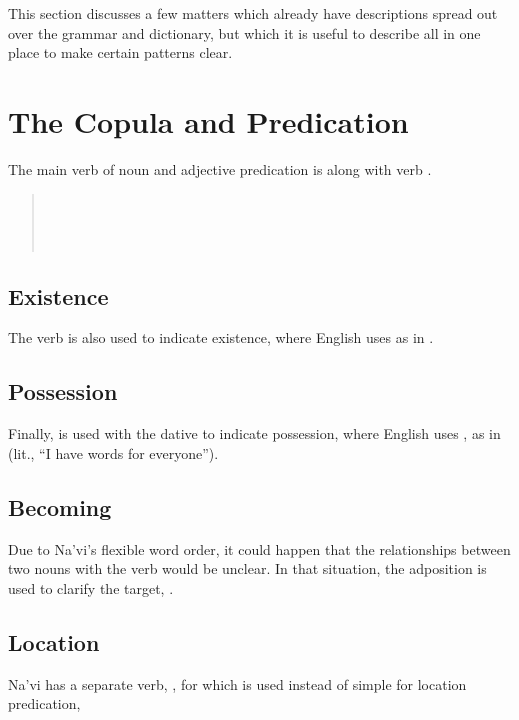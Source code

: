 
This section discusses a few matters which already have descriptions
spread out over the grammar and dictionary, but which it is useful to
describe all in one place to make certain patterns clear.

\section{The Copula and Predication} 
The main verb of noun and adjective predication is  
along with verb  .

\begin{quotation}
\noindent{}  \\
\noindent{}  \\
\noindent{}  \\
\noindent{} 
\end{quotation}

\subsection{Existence}
The verb  is also used to indicate existence, where English uses
 as in 
  .

\subsection{Possession}
Finally,  is used with the dative to indicate possession, where
English uses , as in   (lit., ``I have words for everyone'').

\subsection{Becoming}
Due to Na'vi's flexible word order, it could happen that the
relationships between two nouns with the verb  would be
unclear.  In that situation, the adposition  is used to clarify
the target,  . 

\subsection{Location} Na'vi has a separate verb, , for  which is used instead of simple  for location
predication, 

